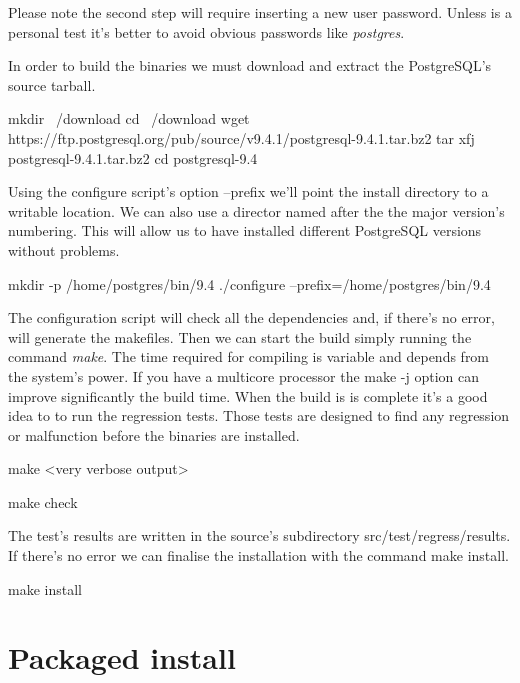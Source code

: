 Please note the second step will require inserting a new user password. Unless is a personal
test it's better to avoid obvious passwords like \textit{postgres}.\newline

In order to build the binaries we must download and extract the PostgreSQL's source tarball.

\begin{tinyverbatim}
mkdir ~/download
cd ~/download
wget https://ftp.postgresql.org/pub/source/v9.4.1/postgresql-9.4.1.tar.bz2
tar xfj postgresql-9.4.1.tar.bz2
cd postgresql-9.4
\end{tinyverbatim}


Using the configure script's option --prefix we'll point the install directory to a writable
location. We can also use a director named after the the major version's numbering. This will allow
us to have installed different PostgreSQL versions without problems.

\begin{tinyverbatim}
mkdir -p /home/postgres/bin/9.4
./configure --prefix=/home/postgres/bin/9.4
\end{tinyverbatim}

The configuration script will check all the dependencies and, if there's no error, will generate 
the makefiles. Then we can start the build simply running the command \textit{make}. The time
required for compiling is variable and depends from the system's power. If you have a multicore
processor the make -j option can improve significantly the build time. When the build is is complete
it's a good idea to to run the regression tests. Those tests are designed to find any regression or
malfunction before the binaries are installed.

\begin{tinyverbatim}
make
<very verbose output>

make check 

\end{tinyverbatim}

The test's results are written in the source's subdirectory src/test/regress/results. If
there's no error we can finalise the installation with the command make install.

\begin{tinyverbatim}
make install
\end{tinyverbatim}



\section{Packaged install}
\label{sec:DEBIAN_INSTALL}

